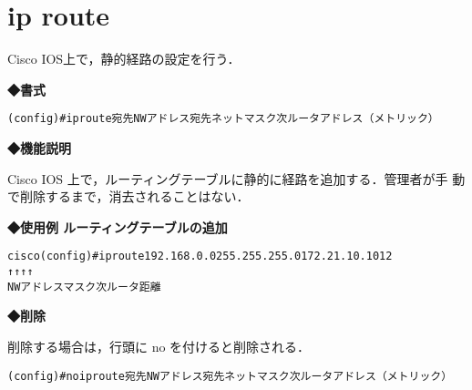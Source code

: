 \section{ip route}
\label{cmd:ios-ip-routeping}
Cisco IOS上で，静的経路の設定を行う．

\noindent
{\bf ◆書式}
\begin{center}
\begin{screen}
\begin{alltt}
 (config)#ip route 宛先NWアドレス 宛先ネットマスク 次ルータアドレス （メトリック）
\end{alltt}
\end{screen}
\end{center}


{\bf ◆機能説明}

Cisco IOS 上で，ルーティングテーブルに静的に経路を追加する．管理者が手
動で削除するまで，消去されることはない．

{\bf ◆使用例    ルーティングテーブルの追加}
\begin{center}
\begin{breakbox}
\begin{alltt}
cisco(config)#ip route 192.168.0.0 255.255.255.0 172.21.10.101 2
                         ↑             ↑           ↑        ↑
                     NWアドレス      マスク     次ルータ      距離
\end{alltt}
\end{breakbox}
\end{center}
                

{\bf ◆削除}

削除する場合は，行頭に no を付けると削除される．

\begin{center}
\begin{screen}
\begin{alltt}
 (config)#no ip route 宛先NWアドレス 宛先ネットマスク 次ルータアドレス （メトリック）
\end{alltt}
\end{screen}
\end{center}

